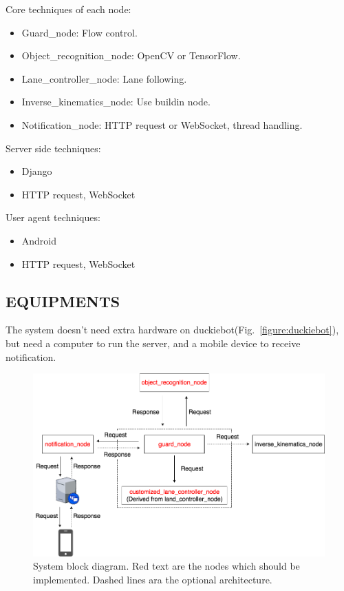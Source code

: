 \documentclass[letterpaper, 10 pt, conference]{ieeeconf}  %
\begin{document}
Core techniques of each node:
\begin{itemize}
  \item Guard\_node: Flow control.
  \item Object\_recognition\_node: OpenCV or TensorFlow.
  \item Lane\_controller\_node: Lane following.
  \item Inverse\_kinematics\_node: Use buildin node.
  \item Notification\_node: HTTP request or WebSocket, thread handling.
\end{itemize}

Server side techniques:
\begin{itemize}
  \item Django
  \item HTTP request, WebSocket
\end{itemize}

User agent techniques:
\begin{itemize}
  \item Android
  \item HTTP request, WebSocket
\end{itemize}

\subsection{EQUIPMENTS} 
The system doesn't need extra hardware on duckiebot(Fig.~\ref{figure:duckiebot}),
but need a computer to run the server, and a mobile device to receive notification.

\begin{figure}[t] %
\includegraphics[width=1\columnwidth]{csp2017}
\centering
\caption{System block diagram. Red text are the nodes which should be implemented. Dashed lines ara the optional architecture.}
\label{figure:system_block_diagram}
\end{figure}
\end{document}
